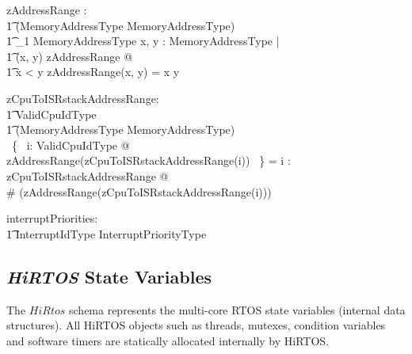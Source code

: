 \documentclass[11pt,letterpaper,twoside,openany]{book}
\begin{document}
\begin{axdef}
    zAddressRange : \\
    \t1 (MemoryAddressType \cross MemoryAddressType) \inj \\
    \t1 \finset_1 MemoryAddressType
\where
    \forall x, y : MemoryAddressType | \\
   \t1  (x, y) \in \dom zAddressRange @ \\
   \t1 x < y \land zAddressRange(x, y) = x \upto y
\end{axdef}

\begin{axdef}
   zCpuToISRstackAddressRange: \\
   \t1 ValidCpuIdType \inj \\
   \t1 (MemoryAddressType \cross MemoryAddressType) \\
\where
   \bigcap~\{~ i: ValidCpuIdType @ \\
     zAddressRange(zCpuToISRstackAddressRange(i)) ~\} = \emptyset
\also
   \forall i : \dom zCpuToISRstackAddressRange @ \\
      \# (zAddressRange(zCpuToISRstackAddressRange(i))) 
\end{axdef}

\begin{axdef}
   interruptPriorities: \\
   \t1 InterruptIdType \fun InterruptPriorityType
\end{axdef}

\subsection{\emph{HiRTOS} State Variables}

The $HiRtos$ schema represents the multi-core RTOS state variables (internal data
structures). All HiRTOS objects such as threads, mutexes,
condition variables and software timers are statically allocated
internally by HiRTOS.
\end{document}
